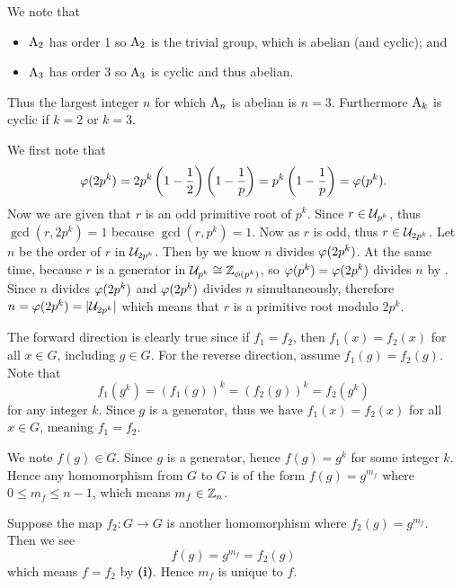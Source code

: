 \begin{questions}
    We note that
    \begin{itemize}
        \item $\mathrm{A}_{2}$ has order 1 so $\mathrm{A}_{2}$ is the trivial group, which is abelian (and cyclic); and
        \item $\mathrm{A}_{3}$ has order 3 so $\mathrm{A}_{3}$ is cyclic and thus abelian.
    \end{itemize}
    Thus the largest integer $n$ for which $\mathrm{A}_{n}$ is abelian is $n = 3$. Furthermore $\mathrm{A}_{k}$ is cyclic if $k = 2$ or $k = 3$.

    \item We first note that
    \[
        \varphi(2p^k) = 2p^k\left(1-\frac12\right)\left(1-\frac1p\right) = p^k\left(1-\frac1p\right) = \varphi(p^k).
    \]
    Now we are given that $r$ is an odd primitive root of $p^k$. Since $r \in \mathcal{U}_{p^k}$, thus $\gcd(r, 2p^k) = 1$ because $\gcd(r, p^k) = 1$. Now as $r$ is odd, thus $r \in \mathcal{U}_{2p^k}$. Let $n$ be the order of $r$ in $\mathcal{U}_{2p^k}$. Then by  we know $n$ divides $\varphi(2p^k)$. At the same time, because $r$ is a generator in $\mathcal{U}_{p^k} \cong \mathbb{Z}_{\phi(p^k)}$, so $\varphi(p^k) = \varphi(2p^k)$ divides $n$ by . Since $n$ divides $\varphi(2p^k)$ and $\varphi(2p^k)$ divides $n$ simultaneously, therefore $n = \varphi(2p^k) = |\mathcal{U}_{2p^k}|$ which means that $r$ is a primitive root modulo $2p^k$.

    \item \begin{partquestions}{\roman*}
        \item The forward direction is clearly true since if $f_1 = f_2$, then $f_1(x) = f_2(x)$ for all $x \in G$, including $g \in G$. For the reverse direction, assume $f_1(g) = f_2(g)$. Note that
        \[
            f_1(g^k) = (f_1(g))^k = (f_2(g))^k = f_2(g^k)
        \]
        for any integer $k$. Since $g$ is a generator, thus we have $f_1(x) = f_2(x)$ for all $x \in G$, meaning $f_1 = f_2$.

        \item We note $f(g) \in G$. Since $g$ is a generator, hence $f(g) = g^k$ for some integer $k$. Hence any homomorphism from $G$ to $G$ is of the form $f(g) = g^{m_f}$ where $0 \leq m_f \leq n-1$, which means $m_f \in \mathbb{Z}_n$.

        \item Suppose the map $f_2: G \to G$ is another homomorphism where $f_2(g) = g^{m_f}$. Then we see
        \[
            f(g) = g^{m_f} = f_2(g)
        \]
        which means $f = f_2$ by \textbf{(i)}. Hence $m_f$ is unique to $f$.


\end{partquestions}
\end{questions}
